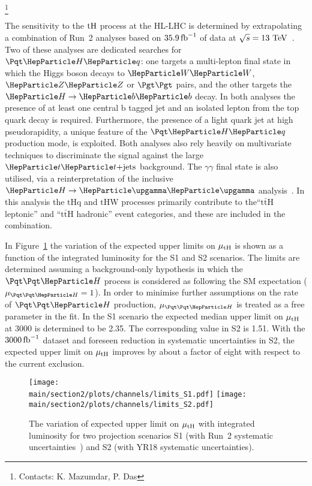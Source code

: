 \footnote{Contacts: K. Mazumdar, P. Das}

The sensitivity to the $\text{tH}$ process at the HL-LHC is determined by extrapolating a combination of Run~2 analyses based on $35.9\mbox{\ensuremath{\,\text{fb}^\text{$-$1}}}$ of data at $\sqrt{s}= 13 ~\text{TeV}$~\cite{Sirunyan:2018lzm}. Two of these analyses are dedicated searches for $\tHq$: one targets a multi-lepton final state in which the Higgs boson decays to $\ww$, $\zz$ or $\tautau$ pairs, and the other targets the $\hbb$ decay. In both analyses the presence of at least one central b tagged jet and an isolated lepton from the top quark decay is required. Furthermore, the presence of a light quark jet at high pseudorapidity, a unique feature of the $\tHq$ production mode, is exploited. Both analyses also rely heavily on multivariate techniques to discriminate the signal against the large $\ttjets$ background. The $\gamma\gamma$ final state is also utilised, via a reinterpretation of the inclusive $\hgg$ analysis~\cite{Sirunyan:2018ouh}. In this analysis the $\mathrm{tHq}$ and $\mathrm{tHW}$ processes primarily contribute to the``$\mathrm{t\bar{t}H}$ leptonic'' and ``$\mathrm{t\bar{t}H}$ hadronic'' event categories, and these are included in the combination.


In Figure~\ref{fig:limit} the variation of the expected upper limits on $\mu_{\text{tH}}$ is shown as a function of the integrated luminosity for the S1 and S2 scenarios. The limits are determined assuming a background-only hypothesis in which the $\tth$ process is considered as following the SM expectation ($\mu_{\tth} = 1$). In order to minimise further assumptions on the rate of $\tth$ production, $\mu_{\tth}$ is treated as a free parameter in the fit.
In the S1 scenario the expected median upper limit on $\mu_{\text{tH}}$ at 3000 \fbinv is determined to be 2.35.
The corresponding value in S2 is 1.51. With the $3000 \mbox{\ensuremath{\,\text{fb}^\text{$-$1}}}$ dataset and foreseen reduction in systematic uncertainties in S2, the expected upper limit on $\mu_{\text{tH}}$ improves by about a factor of eight with respect to the current exclusion.

\begin{figure}[hbtp]
\begin{center}
\texttt{[image: \\main/section2/plots/channels/limits\_S1.pdf]} \hspace{1cm}
\texttt{[image: \\main/section2/plots/channels/limits\_S2.pdf]}
\end{center}
\caption{The variation of expected upper limit on $\mu_{\text{tH}}$ with integrated luminosity for two projection scenarios S1 (with Run~2 systematic uncertainties~\cite{CMS-PAS-HIG-18-009}) and S2 (with YR18 systematic uncertainties).}
\label{fig:limit}
\end{figure}

